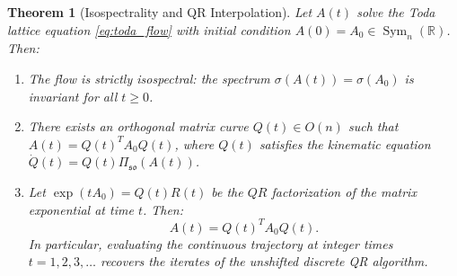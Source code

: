 \documentclass[11pt,a4paper,reqno]{amsart}
\newtheorem{theorem}{Theorem}[section]
\theoremstyle{definition}
\numberwithin{equation}{section}
\newcommand{\R}{\mathbb{R}}
\begin{document}
\begin{theorem}[Isospectrality and QR Interpolation]
\label{thm:toda_qr}
Let $A(t)$ solve the Toda lattice equation \eqref{eq:toda_flow} with initial condition $A(0) = A_0 \in \operatorname{Sym}_n(\R)$. Then:
\begin{enumerate}[label=(\roman*)]
    \item The flow is \emph{strictly isospectral}: the spectrum $\sigma(A(t)) = \sigma(A_0)$ is invariant for all $t \ge 0$.
    \item There exists an orthogonal matrix curve $Q(t) \in O(n)$ such that $A(t) = Q(t)^T A_0 Q(t)$, where $Q(t)$ satisfies the kinematic equation $\dot{Q}(t) = Q(t) \Pi_{\mathfrak{so}}(A(t))$.
    \item Let $\exp(t A_0) = Q(t) R(t)$ be the $QR$ factorization of the matrix exponential at time $t$. Then:
    \begin{equation}
        A(t) = Q(t)^T A_0 Q(t).
    \end{equation}
    In particular, evaluating the continuous trajectory at integer times $t = 1, 2, 3, \dots$ recovers the iterates of the unshifted discrete QR algorithm.
\end{enumerate}
\end{theorem}
\end{document}
